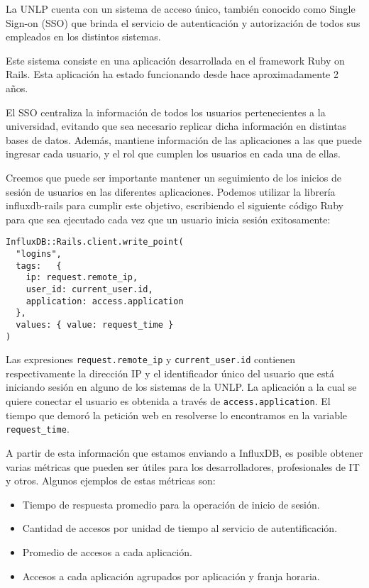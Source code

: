 La UNLP cuenta con un sistema de acceso único, también conocido como Single Sign-on (SSO) que brinda el servicio de autenticación y autorización de todos sus empleados en los distintos sistemas.

Este sistema consiste en una aplicación desarrollada en el framework Ruby on Rails. Esta aplicación ha estado funcionando desde hace aproximadamente 2 años.

El SSO centraliza la información de todos los usuarios pertenecientes a la universidad, evitando que sea necesario replicar dicha información en distintas bases de datos. Además, mantiene información de las aplicaciones a las que puede ingresar cada usuario, y el rol que cumplen los usuarios en cada una de ellas.

Creemos que puede ser importante mantener un seguimiento de los inicios de sesión de usuarios en las diferentes aplicaciones. Podemos utilizar la librería influxdb-rails para cumplir este objetivo, escribiendo el siguiente código Ruby para que sea ejecutado cada vez que un usuario inicia sesión exitosamente:

\begin{lstlisting}
InfluxDB::Rails.client.write_point(
  "logins",
  tags:   { 
    ip: request.remote_ip,
    user_id: current_user.id,
    application: access.application
  },
  values: { value: request_time }
)
\end{lstlisting}

Las expresiones \lstinline{request.remote_ip} y \lstinline{current_user.id} contienen respectivamente la dirección IP y el identificador único del usuario que está iniciando sesión en alguno de los sistemas de la UNLP. La aplicación a la cual se quiere conectar el usuario es obtenida a través de \lstinline{access.application}. El tiempo que demoró la petición web en resolverse lo encontramos en la variable \lstinline{request_time}.

A partir de esta información que estamos enviando a InfluxDB, es posible obtener varias métricas que pueden ser útiles para los desarrolladores, profesionales de IT y otros. Algunos ejemplos de estas métricas son:

\begin{itemize}
  \item Tiempo de respuesta promedio para la operación de inicio de sesión.
  \item Cantidad de accesos por unidad de tiempo al servicio de autentificación.
  \item Promedio de accesos a cada aplicación.
  \item Accesos a cada aplicación agrupados por aplicación y franja horaria.
\end{itemize}

